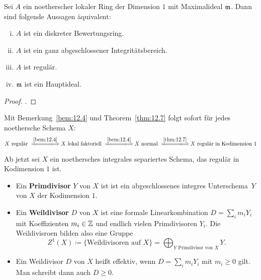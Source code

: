 \begin{thm}
\label{thm:12.7}
	Sei $A$ ein noetherscher lokaler Ring der Dimension $1$ mit Maximalideal $\mathfrak{m}$. Dann sind folgende Aussagen äquivalent:
	\begin{enumerate}[i)]
		\item $A$ ist ein diskreter Bewertungsring.
		\item $A$ ist ein ganz abgeschlossener Integritätsbereich.
		\item $A$ ist regulär.
		\item $\mathfrak{m}$ ist ein Hauptideal.
	\end{enumerate}
	\begin{proof}
		\cite[Proposition~9.2, S.~94]{atiyah1994introduction}.
	\end{proof}
\end{thm}

\begin{bem}
\label{bem:12.8}
	Mit Bemerkung~\ref{bem:12.4} und Theorem~\ref{thm:12.7} folgt sofort für jedes noethersche Schema $X$:
	\[
		X \text{ regulär } \xLongrightarrow{\ref{bem:12.4}} X \text{ lokal faktoriell } \xLongrightarrow{\ref{bem:12.4}} X \text{ normal } \xLongrightarrow{\ref{thm:12.7}} X \text{ regulär in Kodimension } 1
	\]
\end{bem}

Ab jetzt sei $X$ ein noethersches integrales separiertes Schema, das regulär in Kodimension $1$ ist.

\begin{defn}
\label{defn:12.9}
	\begin{itemize}
		\item Ein \textbf{Primdivisor} $Y$ von $X$ ist ist ein abgeschlossenes integres Unterschema~$Y$ von $X$ der Kodimension $1$.
		\item Ein \textbf{Weildivisor} $D$ von $X$ ist eine formale Linearkombination $D=\sum_{i}m_iY_i$ mit Koeffizienten $m_i\in \mathbb {Z}$ und endlich vielen Primdivisoren $Y_i$. Die Weildivisroen bilden also eine Gruppe
		\[
			Z^1(X) \coloneqq \{\text{Weildivisoren auf }X\} = \bigoplus_{Y \text{ Primdivisor von }X}Y.
		\]
		\item Ein Weildivisor $D$ von $X$ heißt effektiv, wenn $D = \sum_{i}m_iY_i$ mit $m_i\ge 0$ gilt. Man schreibt dann auch $D \ge 0$.
	\end{itemize}
\end{defn}


